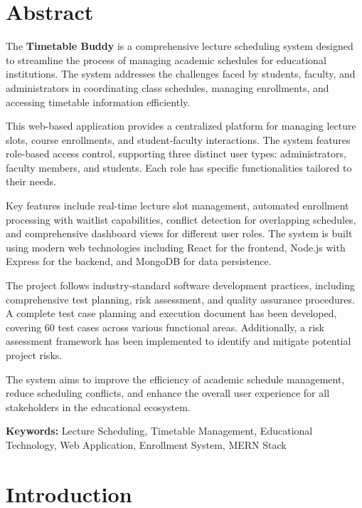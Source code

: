 \documentclass[12pt,a4paper]{report}
\begin{document}
\chapter*{Abstract}
\thispagestyle{empty}

The \textbf{Timetable Buddy} is a comprehensive lecture scheduling system designed to streamline the process of managing academic schedules for educational institutions. The system addresses the challenges faced by students, faculty, and administrators in coordinating class schedules, managing enrollments, and accessing timetable information efficiently.

This web-based application provides a centralized platform for managing lecture slots, course enrollments, and student-faculty interactions. The system features role-based access control, supporting three distinct user types: administrators, faculty members, and students. Each role has specific functionalities tailored to their needs.

Key features include real-time lecture slot management, automated enrollment processing with waitlist capabilities, conflict detection for overlapping schedules, and comprehensive dashboard views for different user roles. The system is built using modern web technologies including React for the frontend, Node.js with Express for the backend, and MongoDB for data persistence.

The project follows industry-standard software development practices, including comprehensive test planning, risk assessment, and quality assurance procedures. A complete test case planning and execution document has been developed, covering 60 test cases across various functional areas. Additionally, a risk assessment framework has been implemented to identify and mitigate potential project risks.

The system aims to improve the efficiency of academic schedule management, reduce scheduling conflicts, and enhance the overall user experience for all stakeholders in the educational ecosystem.

\textbf{Keywords:} Lecture Scheduling, Timetable Management, Educational Technology, Web Application, Enrollment System, MERN Stack

\tableofcontents
\listoffigures
\listoftables

\chapter{Introduction}
\end{document}
